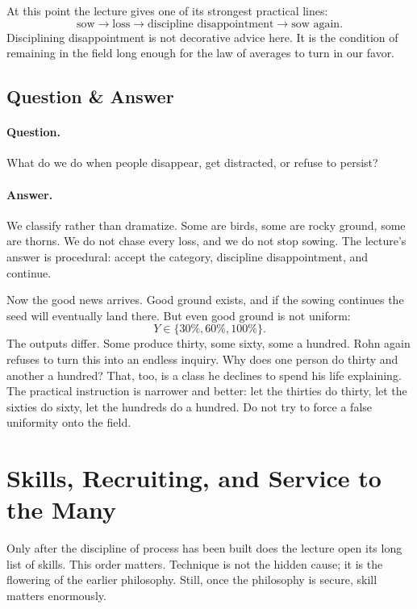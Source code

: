 At this point the lecture gives one of its strongest practical lines:
\begin{equation}
\text{sow}
\longrightarrow
\text{loss}
\longrightarrow
\text{discipline disappointment}
\longrightarrow
\text{sow again}.
\end{equation}
Disciplining disappointment is not decorative advice here. It is the condition of remaining in the field long enough for the law of averages to turn in our favor.

\subsection{Question \& Answer}

\paragraph{Question.} What do we do when people disappear, get distracted, or refuse to persist?

\paragraph{Answer.} We classify rather than dramatize. Some are birds, some are rocky ground, some are thorns. We do not chase every loss, and we do not stop sowing. The lecture's answer is procedural: accept the category, discipline disappointment, and continue.

Now the good news arrives. Good ground exists, and if the sowing continues the seed will eventually land there. But even good ground is not uniform:
\begin{equation}
Y \in \{30\%,60\%,100\%\}.
\end{equation}
The outputs differ. Some produce thirty, some sixty, some a hundred. Rohn again refuses to turn this into an endless inquiry. Why does one person do thirty and another a hundred? That, too, is a class he declines to spend his life explaining. The practical instruction is narrower and better: let the thirties do thirty, let the sixties do sixty, let the hundreds do a hundred. Do not try to force a false uniformity onto the field.

\section{Skills, Recruiting, and Service to the Many}

Only after the discipline of process has been built does the lecture open its long list of skills. This order matters. Technique is not the hidden cause; it is the flowering of the earlier philosophy. Still, once the philosophy is secure, skill matters enormously.

